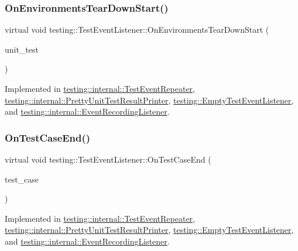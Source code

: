 \subsubsection{\texorpdfstring{OnEnvironmentsTearDownStart()}{OnEnvironmentsTearDownStart()}}
{\footnotesize\ttfamily virtual void testing\+::\+Test\+Event\+Listener\+::\+On\+Environments\+Tear\+Down\+Start (\begin{DoxyParamCaption}\item[{const \mbox{\hyperlink{classtesting_1_1UnitTest}{Unit\+Test}} \&}]{unit\+\_\+test }\end{DoxyParamCaption})\hspace{0.3cm}{\ttfamily [pure virtual]}}



Implemented in \mbox{\hyperlink{classtesting_1_1internal_1_1TestEventRepeater_a30db75df2d9a65d787f31e16004613c2}{testing\+::internal\+::\+Test\+Event\+Repeater}}, \mbox{\hyperlink{classtesting_1_1internal_1_1PrettyUnitTestResultPrinter_afea9dc849c92fdbc1d8505f4c74ffc1a}{testing\+::internal\+::\+Pretty\+Unit\+Test\+Result\+Printer}}, \mbox{\hyperlink{classtesting_1_1EmptyTestEventListener_a00fa1a4ea5831e20746188414268e7c6}{testing\+::\+Empty\+Test\+Event\+Listener}}, and \mbox{\hyperlink{classtesting_1_1internal_1_1EventRecordingListener_a17eebd7bb5cc6bab53b20794919ca5ae}{testing\+::internal\+::\+Event\+Recording\+Listener}}.

\mbox{\label{classtesting_1_1TestEventListener_ae61985e2ef76ac78379b077be57a9c36}} 
\subsubsection{\texorpdfstring{OnTestCaseEnd()}{OnTestCaseEnd()}}
{\footnotesize\ttfamily virtual void testing\+::\+Test\+Event\+Listener\+::\+On\+Test\+Case\+End (\begin{DoxyParamCaption}\item[{const \mbox{\hyperlink{classtesting_1_1TestCase}{Test\+Case}} \&}]{test\+\_\+case }\end{DoxyParamCaption})\hspace{0.3cm}{\ttfamily [pure virtual]}}



Implemented in \mbox{\hyperlink{classtesting_1_1internal_1_1TestEventRepeater_a0a335e1c3957a8c699ed56e37ea7b978}{testing\+::internal\+::\+Test\+Event\+Repeater}}, \mbox{\hyperlink{classtesting_1_1internal_1_1PrettyUnitTestResultPrinter_a7a62fe58fa6f6aace813eb62b31e5a51}{testing\+::internal\+::\+Pretty\+Unit\+Test\+Result\+Printer}}, \mbox{\hyperlink{classtesting_1_1EmptyTestEventListener_a6bec703158283104c4298f7d8a528515}{testing\+::\+Empty\+Test\+Event\+Listener}}, and \mbox{\hyperlink{classtesting_1_1internal_1_1EventRecordingListener_a4d0cb8a389c7339bce0aa6128291529f}{testing\+::internal\+::\+Event\+Recording\+Listener}}.


